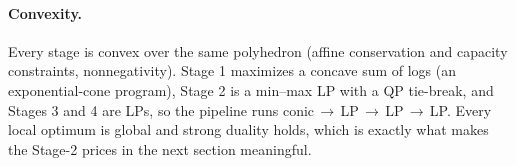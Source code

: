 \paragraph{Convexity.} Every stage is convex over the same polyhedron (affine
conservation and capacity constraints, nonnegativity). Stage 1 maximizes a concave
sum of logs (an exponential-cone program), Stage 2 is a min--max LP with a QP
tie-break, and Stages 3 and 4 are LPs, so the pipeline runs
conic\,$\to$\,LP\,$\to$\,LP\,$\to$\,LP. Every local optimum is global and strong
duality holds, which is exactly what makes the Stage-2 prices in the next section
meaningful.
